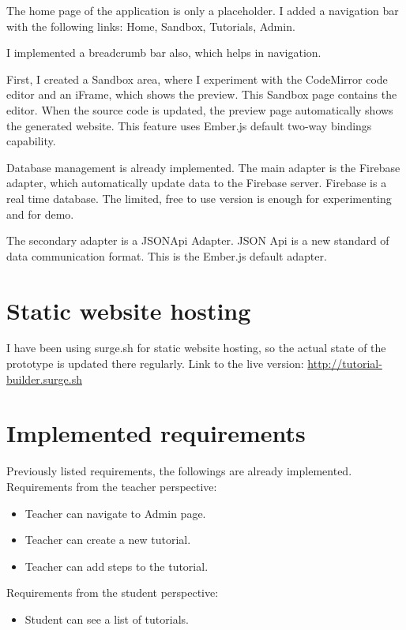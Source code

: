 \documentclass[11pt, a4paper, twoside, openright]{report}
\begin{document}
The home page of the application is only a placeholder. I added a navigation bar with the following links: Home, Sandbox, Tutorials, Admin.

I implemented a breadcrumb bar also, which helps in navigation.

First, I created a Sandbox area, where I experiment with the CodeMirror code editor and an iFrame, which shows the preview. This Sandbox page contains the editor. When the source code is updated, the preview page automatically shows the generated website. This feature uses Ember.js default two-way bindings capability.

Database management is already implemented. The main adapter is the Firebase adapter, which automatically update data to the Firebase server. Firebase is a real time database. The limited, free to use version is enough for experimenting and for demo.

The secondary adapter is a JSONApi Adapter. JSON Api \cite{jsonapi} is a new standard of data communication format. This is the Ember.js default adapter.

\section{Static website hosting}

I have been using surge.sh \cite{surge} for static website hosting, so the actual state of the prototype is updated there regularly. Link to the live version: \url{http://tutorial-builder.surge.sh}

\section{Implemented requirements}

Previously listed requirements, the followings are already implemented. \\

\noindent Requirements from the teacher perspective:
\begin{itemize}[noitemsep]
\item {} Teacher can navigate to Admin page.
\item {} Teacher can create a new tutorial.
\item {} Teacher can add steps to the tutorial.
\end{itemize}

\noindent Requirements from the student perspective:
\begin{itemize}[noitemsep]
\item {} Student can see a list of tutorials.
\end{itemize}
\end{document}
